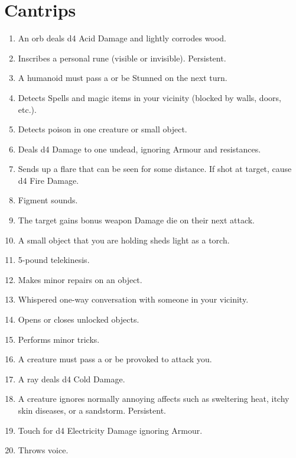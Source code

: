 \documentclass[itdr]{subfiles}
\begin{document}
\section{Cantrips}
\def \spellcircle {C}
\begin{enumerate}
	\item {} An orb deals d4 Acid Damage and lightly corrodes wood.
	\item {} Inscribes a personal rune (visible or invisible). Persistent.
	\item {} A humanoid must pass a  or be Stunned on the next turn.
	\item {} Detects Spells and magic items in your vicinity (blocked by walls, doors, etc.).
	\item {} Detects poison in one creature or small object.
	\item {} Deals d4 Damage to one undead, ignoring Armour and resistances.
	\item {} Sends up a flare that can be seen for some distance. If shot at target, cause d4 Fire Damage.
	\item {} Figment sounds.
	\item {} The target gains bonus weapon Damage die on their next attack.
	\item {} A small object that you are holding sheds light as a torch.
	\item {} 5-pound telekinesis.
	\item {} Makes minor repairs on an object.
	\item {} Whispered one-way conversation with someone in your vicinity.
	\item {} Opens or closes unlocked objects.
	\item {} Performs minor tricks.
	\item {} A creature must pass a  or be provoked to attack you.
	\item {} A ray deals d4 Cold Damage.
	\item {} A creature ignores normally annoying affects such as sweltering heat, itchy skin diseases, or a sandstorm. Persistent.
	\item {} Touch for d4 Electricity Damage ignoring Armour.
	\item {} Throws voice.
\end{enumerate}
\end{document}
